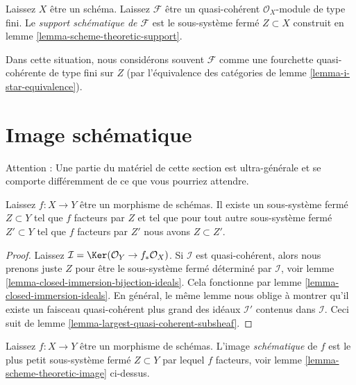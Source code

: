\begin{definition}

\label{definition-scheme-theoretic-support}
Laissez $X$ être un schéma. Laissez $\mathcal{F}$ être un quasi-cohérent $\mathcal{O}_X$-module de type fini. Le {\it support schématique de $\mathcal{F}$} est le sous-système fermé $Z \subset X$ construit en lemme \ref{lemma-scheme-theoretic-support}.
\end{definition}

\noindent
Dans cette situation, nous considérons souvent $\mathcal{F}$ comme une fourchette quasi-cohérente de type fini sur $Z$ (par l'équivalence des catégories de lemme \ref{lemma-i-star-equivalence}).













\section{Image schématique}
\label{section-scheme-theoretic-image}

\noindent
Attention : Une partie du matériel de cette section est ultra-générale et se comporte différemment de ce que vous pourriez attendre.

\begin{lemma}

\label{lemma-scheme-theoretic-image}
Laissez $f : X \to Y$ être un morphisme de schémas. Il existe un sous-système fermé $Z \subset Y$ tel que $f$ facteurs par $Z$ et tel que pour tout autre sous-système fermé $Z' \subset Y$ tel que $f$ facteurs par $Z'$ nous avons $Z \subset Z'$.
\end{lemma}

\begin{proof}
Laissez $\mathcal{I} = \Ker(\mathcal{O}_Y \to f_*\mathcal{O}_X)$. Si $\mathcal{I}$ est quasi-cohérent, alors nous prenons juste $Z$ pour être le sous-système fermé déterminé par $\mathcal{I}$, voir lemme \ref{lemma-closed-immersion-bijection-ideals}. Cela fonctionne par lemme \ref{lemma-closed-immersion-ideals}. En général, le même lemme nous oblige à montrer qu'il existe un faisceau quasi-cohérent plus grand des idéaux $\mathcal{I}'$ contenus dans $\mathcal{I}$. Ceci suit de lemme \ref{lemma-largest-quasi-coherent-subsheaf}.
\end{proof}

\begin{definition}

\label{definition-scheme-theoretic-image}
Laissez $f : X \to Y$ être un morphisme de schémas. L'image {\it schématique} de $f$ est le plus petit sous-système fermé $Z \subset Y$ par lequel $f$ facteurs, voir lemme \ref{lemma-scheme-theoretic-image} ci-dessus.
\end{definition}

